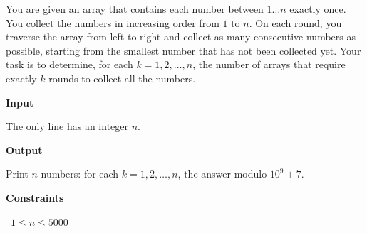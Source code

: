 You are given an array that contains each number between $1 \dots n$ exactly once. You collect the numbers in increasing order from $1$ to $n$. On each round, you traverse the array from left to right and collect as many consecutive numbers as possible, starting from the smallest number that has not been collected yet.
Your task is to determine, for each $k=1,2,\dots,n$, the number of arrays that require exactly $k$ rounds to collect all the numbers.

\vspace{0.3cm}\noindent\textbf{Input}

The only line has an integer $n$.

\vspace{0.3cm}\noindent\textbf{Output}

Print $n$ numbers: for each $k=1,2,\dots,n$, the answer modulo $10^9+7$.

\vspace{0.3cm}\noindent\textbf{Constraints}

\textbullet\ $1 \le n \le 5000$